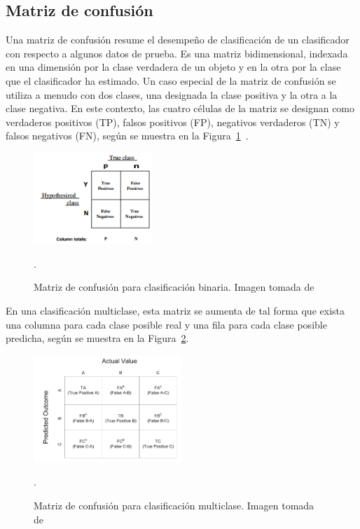 \subsection{Matriz de confusión}
Una matriz de confusión resume el desempeño de clasificación de un clasificador con respecto a algunos datos de prueba. Es una matriz bidimensional, indexada en una dimensión por la clase verdadera de un objeto y en la otra por la clase que el clasificador ha estimado. Un caso especial de la matriz de confusión se utiliza a menudo con dos clases, una designada la clase positiva y la otra a la clase negativa. En este contexto, las cuatro células de la matriz se designan como verdaderos positivos (TP), falsos positivos (FP), negativos verdaderos (TN) y falsos negativos (FN), según se muestra en la Figura~\ref{fig.matriz}~\cite{sammut2011encyclopedia}.

\begin{figure}[H]
	\begin{center}
		\includegraphics[width=0.4\textwidth]{figures/matriz}
		\caption{Matriz de confusión para clasificación binaria. Imagen tomada de~\cite{FAWCETT2006861}}. 
		\label{fig.matriz}
	\end{center}
\end{figure}
En una clasificación multiclase, esta matriz se aumenta de tal forma que exista una columna para cada clase posible real y una fila para cada clase posible predicha, según se muestra en la Figura~\ref{fig.matriz2}. 

\begin{figure}[H]
	\begin{center}
		\includegraphics[width=0.5\textwidth]{figures/matriz2}
		\caption{Matriz de confusión para clasificación multiclase. Imagen tomada de~\cite{kolo2011binary}}. 
		\label{fig.matriz2}
	\end{center}
\end{figure}

